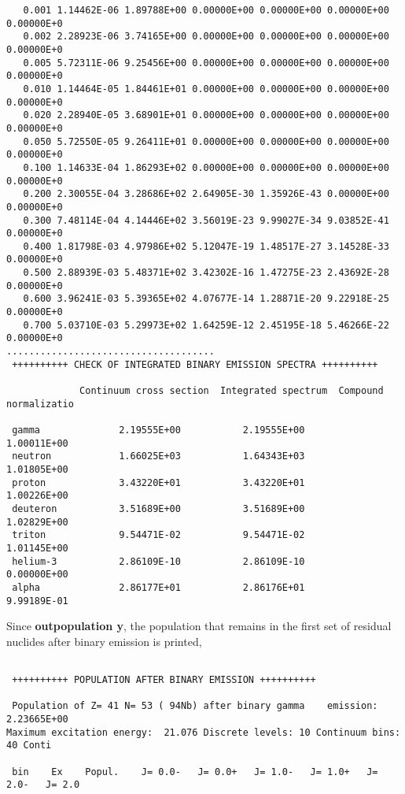 \begin{samplecase}
{\begin{verbatim}
   0.001 1.14462E-06 1.89788E+00 0.00000E+00 0.00000E+00 0.00000E+00 0.00000E+0
   0.002 2.28923E-06 3.74165E+00 0.00000E+00 0.00000E+00 0.00000E+00 0.00000E+0
   0.005 5.72311E-06 9.25456E+00 0.00000E+00 0.00000E+00 0.00000E+00 0.00000E+0
   0.010 1.14464E-05 1.84461E+01 0.00000E+00 0.00000E+00 0.00000E+00 0.00000E+0
   0.020 2.28940E-05 3.68901E+01 0.00000E+00 0.00000E+00 0.00000E+00 0.00000E+0
   0.050 5.72550E-05 9.26411E+01 0.00000E+00 0.00000E+00 0.00000E+00 0.00000E+0
   0.100 1.14633E-04 1.86293E+02 0.00000E+00 0.00000E+00 0.00000E+00 0.00000E+0
   0.200 2.30055E-04 3.28686E+02 2.64905E-30 1.35926E-43 0.00000E+00 0.00000E+0
   0.300 7.48114E-04 4.14446E+02 3.56019E-23 9.99027E-34 9.03852E-41 0.00000E+0
   0.400 1.81798E-03 4.97986E+02 5.12047E-19 1.48517E-27 3.14528E-33 0.00000E+0
   0.500 2.88939E-03 5.48371E+02 3.42302E-16 1.47275E-23 2.43692E-28 0.00000E+0
   0.600 3.96241E-03 5.39365E+02 4.07677E-14 1.28871E-20 9.22918E-25 0.00000E+0
   0.700 5.03710E-03 5.29973E+02 1.64259E-12 2.45195E-18 5.46266E-22 0.00000E+0
.....................................
 ++++++++++ CHECK OF INTEGRATED BINARY EMISSION SPECTRA ++++++++++
 
             Continuum cross section  Integrated spectrum  Compound normalizatio
    
 gamma              2.19555E+00           2.19555E+00           1.00011E+00     
 neutron            1.66025E+03           1.64343E+03           1.01805E+00     
 proton             3.43220E+01           3.43220E+01           1.00226E+00     
 deuteron           3.51689E+00           3.51689E+00           1.02829E+00     
 triton             9.54471E-02           9.54471E-02           1.01145E+00     
 helium-3           2.86109E-10           2.86109E-10           0.00000E+00     
 alpha              2.86177E+01           2.86176E+01           9.99189E-01     
\end{verbatim} } \renewcommand{\baselinestretch}{1.07}\small\normalsize
\noindent
Since {\bf outpopulation y}, the population that remains in the first set of 
residual nuclides after binary emission is printed,

{\small \begin{verbatim}

 ++++++++++ POPULATION AFTER BINARY EMISSION ++++++++++

 Population of Z= 41 N= 53 ( 94Nb) after binary gamma    emission: 2.23665E+00
Maximum excitation energy:  21.076 Discrete levels: 10 Continuum bins: 40 Conti
 
 bin    Ex    Popul.    J= 0.0-   J= 0.0+   J= 1.0-   J= 1.0+   J= 2.0-   J= 2.0


\end{verbatim}}
\end{samplecase}
